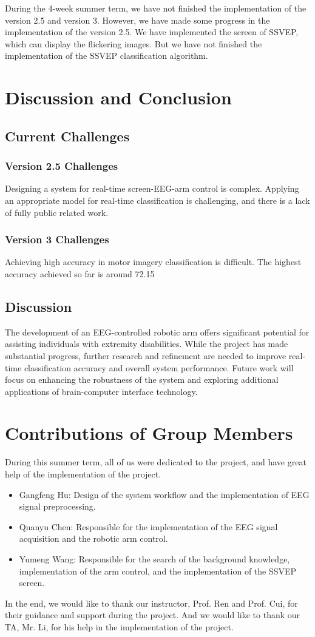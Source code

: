 \documentclass[12pt]{report}
\begin{document}
During the 4-week summer term, we have not finished the implementation of the version 2.5 and version 3. 
However, we have made some progress in the implementation of the version 2.5. 
We have implemented the screen of SSVEP, which can display the flickering images. 
But we have not finished the implementation of the SSVEP classification algorithm.

\chapter{Discussion and Conclusion}
\section{Current Challenges}
\subsection{Version 2.5 Challenges}
Designing a system for real-time screen-EEG-arm control is complex. Applying an appropriate model for real-time classification is challenging, and there is a lack of fully public related work.

\subsection{Version 3 Challenges}
Achieving high accuracy in motor imagery classification is difficult. The highest accuracy achieved so far is around 72.15%

\section{Discussion}
The development of an EEG-controlled robotic arm offers significant potential for assisting individuals with extremity disabilities. While the project has made substantial progress, further research and refinement are needed to improve real-time classification accuracy and overall system performance. Future work will focus on enhancing the robustness of the system and exploring additional applications of brain-computer interface technology.

\chapter{Contributions of Group Members}
During this summer term, all of us were dedicated to the project, and have great help of the implementation of the project.
\begin{itemize}
    \item Gangfeng Hu: Design of the system workflow and the implementation of EEG signal preprocessing.
    \item Quanyu Chen: Responsible for the implementation of the EEG signal acquisition and the robotic arm control.
    \item Yumeng Wang: Responsible for the search of the background knowledge, implementation of the arm control, and the implementation of the SSVEP screen.
\end{itemize}


In the end, we would like to thank our instructor, Prof. Ren and Prof. Cui, for their guidance and support during the project.
And we would like to thank our TA, Mr. Li, for his help in the implementation of the project.
\end{document}
